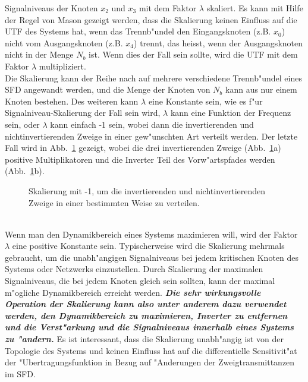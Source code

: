 Signalniveaus der Knoten $x_2$ und $x_3$ mit dem Faktor $\lambda$
skaliert. Es kann mit Hilfe der Regel von Mason gezeigt
werden, dass die Skalierung keinen Einfluss auf die UTF des Systems
hat, wenn das Trennb"undel den Eingangsknoten (z.B. $x_0$) nicht vom
Ausgangsknoten (z.B. $x_4$) trennt, das heisst, wenn der
Ausgangsknoten nicht in der Menge $N_b$ ist. Wenn dies der Fall sein
sollte, wird die UTF mit dem
Faktor $\lambda$ multipliziert.\\
\nit Die Skalierung kann der Reihe nach auf mehrere verschiedene
Trennb"undel eines SFD angewandt werden, und die Menge der Knoten von
$N_b$ kann aus nur einem Knoten bestehen.  Des weiteren kann $\lambda$
eine Konstante sein, wie es f"ur Signalniveau-Skalierung der Fall sein
wird, $\lambda$ kann eine Funktion der Frequenz sein, oder $\lambda$
kann einfach -1 sein, wobei dann die invertierenden und
nichtinvertierenden Zweige in einer gew"unschten Art verteilt werden.
Der letzte Fall wird in Abb.~\ref{SFD41} gezeigt, wobei die drei
invertierenden Zweige (Abb.~\ref{SFD41}a) positive Multiplikatoren und
die Inverter Teil des Vorw"artspfades werden (Abb.~\ref{SFD41}b).
\begin{figure}[htb!]
\begin{center}
  \caption{Skalierung mit -1, um die invertierenden und
nichtinvertierenden Zweige in einer bestimmten Weise zu verteilen.}\label{SFD41}
\end{center}\vspace*{-7mm}
\end{figure}\\
\nit Wenn man den Dynamikbereich eines Systems
maximieren will, wird der Faktor $\lambda$ eine positive Konstante
sein.  Typischerweise wird die Skalierung mehrmals gebraucht, um die
unabh"angigen Signalniveaus bei jedem kritischen Knoten des Systems
oder Netzwerks einzustellen. Durch Skalierung der maximalen
Signalniveaus, die bei jedem Knoten gleich sein sollten, kann der
maximal m"ogliche Dynamikbereich erreicht werden. \textbf{\emph{Die
    sehr wirkungsvolle Operation der Skalierung kann also unter
    anderem dazu verwendet werden, den
    Dynamikbereich zu maximieren, Inverter zu
    entfernen und die Verst"arkung und die Signalniveaus innerhalb
    eines Systems zu "andern.}} Es ist interessant, dass die
Skalierung unabh"angig ist von der Topologie des Systems und keinen
Einfluss hat auf die differentielle Sensitivit"at der
"Ubertragungsfunktion in Bezug auf "Anderungen der Zweigtransmittanzen
im SFD.

